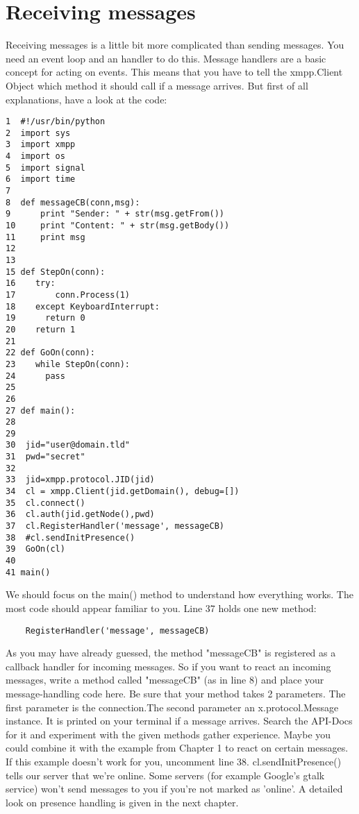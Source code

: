 \section{Receiving messages}

Receiving messages is a little bit more complicated than sending messages. You need an event loop and an handler to do this.
\newline
Message handlers are a basic concept for acting on events. This means that you have to tell the xmpp.Client Object which method it should call if a message arrives. But first of all explanations, have a look at the code:
\newline
\newline
\begin{verbatim}
1  #!/usr/bin/python
2  import sys
3  import xmpp
4  import os
5  import signal
6  import time
7
8  def messageCB(conn,msg):
9      print "Sender: " + str(msg.getFrom())
10     print "Content: " + str(msg.getBody())
11     print msg
12
13
15 def StepOn(conn):
16    try:
17        conn.Process(1)
18    except KeyboardInterrupt:
19	    return 0
20    return 1
21
22 def GoOn(conn):
23    while StepOn(conn):
24	    pass
25
26
27 def main():
28
29
30	jid="user@domain.tld"
31	pwd="secret"
32
33	jid=xmpp.protocol.JID(jid)
34	cl = xmpp.Client(jid.getDomain(), debug=[])
35	cl.connect()
36	cl.auth(jid.getNode(),pwd)
37	cl.RegisterHandler('message', messageCB)
38	#cl.sendInitPresence()
39	GoOn(cl)
40
41 main()
\end{verbatim}
We should focus on the main() method to understand how everything works. The most code should appear familiar to you. Line 37 holds one new method: \begin{verbatim}	RegisterHandler('message', messageCB)\end{verbatim}
As you may have already guessed, the method "messageCB" is registered as a callback handler for incoming messages. So if you want to react an incoming messages, write a method called "messageCB" (as in line 8)
and place your message-handling code here. Be sure that your method takes 2 parameters.
The first parameter is the connection.The second parameter an x.protocol.Message instance. It is printed on your terminal if a message arrives. Search the API-Docs for it and experiment with the given methods gather experience. Maybe you could combine it with the example from Chapter 1 to react on certain messages.
\newline
\newline
If this example doesn't work for you, uncomment line 38. cl.sendInitPresence() tells our server that we're online. Some servers (for example Google's gtalk service) won't send messages to you if you're not marked as 'online'. A detailed look on presence handling is given in the next chapter.


